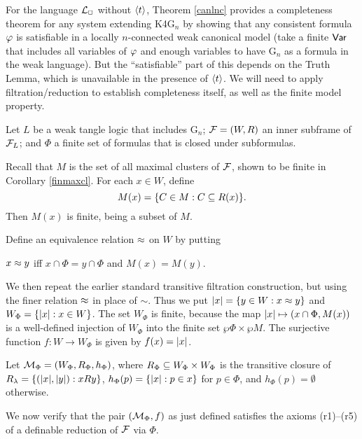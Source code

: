 For the language ${\cal L}_\Box$ without $\langle t\rangle$, Theorem \ref{canlnc} provides a completeness  theorem for any system extending  K4G$_n$ by showing that any consistent formula $\varphi$ is satisfiable in a locally $n$-connected weak canonical model (take a finite $\mathsf{Var}$ that includes all variables of $\varphi$ and enough variables to have G$_n$ as a formula in the weak language). But  the ``satisfiable'' part of this depends on the Truth Lemma, which is unavailable in the presence of $\langle t\rangle$. We will need to apply filtration/reduction to establish completeness itself,  as well as  the finite model property.

Let $L$ be a weak tangle logic that includes G$_n$;  $\mathcal{F}=(W,R)$ an inner subframe of $\mathcal{F}_L$; and $\Phi$ a finite set of formulas that is closed under subformulas.

Recall that $M$ is the  set of all maximal clusters of $\mathcal{F}$, shown to be finite in Corollary \ref{finmaxcl}. 
For each $x\in W$, define  $$M(x)=\{C\in M: C\subseteq R(x)\}.$$ Then $M(x)$ is finite, being a subset of $M$.
 
Define an equivalence relation $\approx$ on $W$ by putting 
\begin{center}
$x\approx y$ iff $x\cap\Phi=y\cap\Phi$ and $M(x)=M(y)$. 
\end{center}
We then repeat the earlier standard transitive filtration construction, but using the finer relation $\approx$ in place of $\sim$.
Thus we put  $|x|=\{y\in W:x\approx y\}$ and  $W_\Phi=\{|x|:x\in W\}$.  The set $W_\Phi$ is finite, because the map $|x|\mapsto (x\cap\Phi,M(x))$ is a well-defined injection of $W_\Phi$ into the finite set $\wp\Phi\times\wp M$.
The surjective function  $f:W\to W_\Phi$ is given by $f(x)=|x|$.

Let $\mathcal{M}_\Phi=(W_\Phi,R_\Phi,h_\Phi)$, where $R_\Phi\subseteq W_\Phi\times W_\Phi$ is the transitive closure of 
$R_\lambda=\{(|x|,|y|):xRy\}$,  $h_\Phi(p)=\{|x|: p\in x\}$ for $p\in\Phi$, and $h_\Phi(p)=\emptyset$  otherwise. 


We now verify that the pair $(\mathcal{M}_\Phi,f)$ as just defined satisfies the axioms (r1)--(r5) of a definable reduction of $\mathcal{F}$ via $\Phi$.

